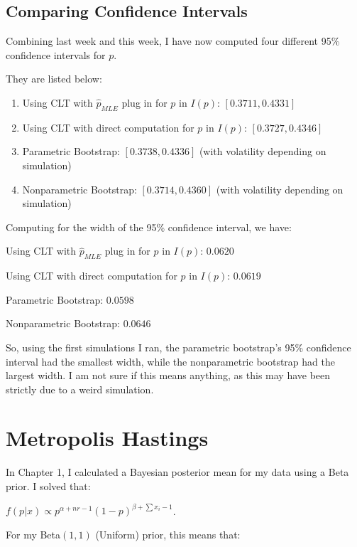 \documentclass[
  letterpaper,
  DIV=11,
  numbers=noendperiod]{scrreprt}
\providecommand{\tightlist}{%
  \setlength{\itemsep}{0pt}\setlength{\parskip}{0pt}}
\begin{document}
\subsection{Comparing Confidence
Intervals}\label{comparing-confidence-intervals}

Combining last week and this week, I have now computed four different
95\% confidence intervals for \(p\).

They are listed below:

\begin{enumerate}
\def\labelenumi{\arabic{enumi}.}
\tightlist
\item
  Using CLT with \(\hat{p}_{MLE}\) plug in for \(p\) in \(I(p)\):
  \([0.3711, 0.4331]\)
\item
  Using CLT with direct computation for \(p\) in \(I(p)\):
  \([0.3727, 0.4346]\)
\item
  Parametric Bootstrap: \([0.3738, 0.4336]\) (with volatility depending
  on simulation)
\item
  Nonparametric Bootstrap: \([0.3714, 0.4360]\) (with volatility
  depending on simulation)
\end{enumerate}

Computing for the width of the 95\% confidence interval, we have:

Using CLT with \(\hat{p}_{MLE}\) plug in for \(p\) in \(I(p)\):
\(0.0620\)

Using CLT with direct computation for \(p\) in \(I(p)\): \(0.0619\)

Parametric Bootstrap: \(0.0598\)

Nonparametric Bootstrap: \(0.0646\)

So, using the first simulations I ran, the parametric bootstrap's 95\%
confidence interval had the smallest width, while the nonparametric
bootstrap had the largest width. I am not sure if this means anything,
as this may have been strictly due to a weird simulation.

\section{Metropolis Hastings}\label{metropolis-hastings}

In Chapter 1, I calculated a Bayesian posterior mean for my data using a
Beta prior. I solved that:

\(f(p | x) \propto p^{\alpha + nr - 1} (1-p)^{\beta + \sum x_i - 1}\).

For my Beta\((1,1)\) (Uniform) prior, this means that:
\end{document}
